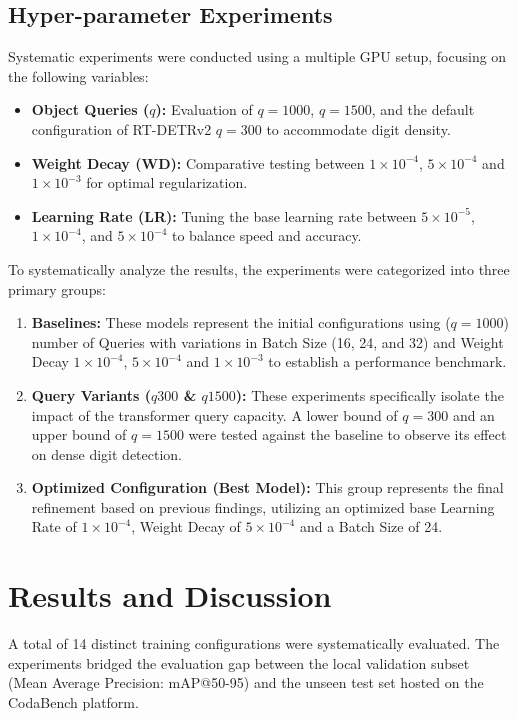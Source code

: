 \documentclass[12pt, a4paper]{article}
\begin{document}
\subsection{Hyper-parameter Experiments}
Systematic experiments were conducted using a multiple GPU setup, focusing on the following variables:
\begin{itemize}
    \item \textbf{Object Queries ($q$):} Evaluation of $q=1000$, $q=1500$, and the default configuration of RT-DETRv2 $q=300$ to accommodate digit density.
    \item \textbf{Weight Decay (WD):} Comparative testing between $1 \times 10^{-4}$, $5 \times 10^{-4}$ and $1 \times 10^{-3}$ for optimal regularization.
    \item \textbf{Learning Rate (LR):} Tuning the base learning rate between $5 \times 10^{-5}$, $1 \times 10^{-4}$, and $5 \times 10^{-4}$ to balance speed and accuracy.
\end{itemize}
To systematically analyze the results, the experiments were categorized into three primary groups:

\begin{enumerate}
    \item \textbf{Baselines:} These models represent the initial configurations using ($q=1000$) number of Queries with variations in Batch Size (16, 24, and 32) and Weight Decay $1 \times 10^{-4}$, $5 \times 10^{-4}$ and $1 \times 10^{-3}$ to establish a performance benchmark.
    \item \textbf{Query Variants ($q300$ \& $q1500$):} These experiments specifically isolate the impact of the transformer query capacity. A lower bound of $q=300$ and an upper bound of $q=1500$ were tested against the baseline to observe its effect on dense digit detection.
    \item \textbf{Optimized Configuration (Best Model):} This group represents the final refinement based on previous findings, utilizing an optimized base Learning Rate of $1 \times 10^{-4}$, Weight Decay of $5 \times 10^{-4}$ and a Batch Size of 24.
\end{enumerate}

\section{Results and Discussion}

A total of 14 distinct training configurations were systematically evaluated. The experiments bridged the evaluation gap between the local validation subset (Mean Average Precision: mAP@50-95) and the unseen test set hosted on the CodaBench platform.
\end{document}
